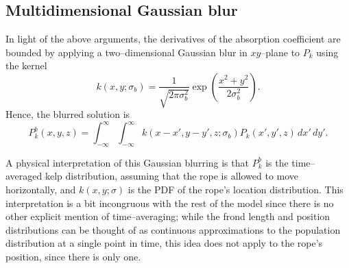 \subsection{Multidimensional Gaussian blur}
In light of the above arguments, the derivatives of the absorption coefficient are bounded by applying a two--dimensional Gaussian blur in $xy$--plane to $P_k$ using the kernel
\begin{equation}
  k(x, y; \sigma_b) = \frac{1}{\sqrt{2\pi\sigma_b^2}} \exp\left(\frac{x^2 + y^2}{2\sigma_b^2}\right).
\end{equation}
Hence, the blurred solution is
\begin{equation}
  P_k^b(x, y, z) = \int_{-\infty}^\infty \int_{-\infty}^\infty k(x-x', y-y', z; \sigma_b) P_k(x', y', z)\, dx'\, dy'.
\end{equation}

A physical interpretation of this Gaussian blurring is that $P_k^b$ is the time--averaged kelp distribution, assuming that the rope is allowed to move horizontally, and $k(x, y; \sigma)$ is the PDF of the rope's location distribution.
This interpretation is a bit incongruous with the rest of the model since there is no other explicit mention of time--averaging; while the frond length and position distributions can be thought of as continuous approximations to the population distribution at a single point in time, this idea does not apply to the rope's position, since there is only one.

